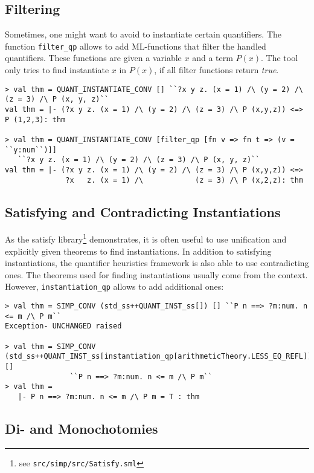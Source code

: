 \documentclass[a4paper,12pt,DIV=12,oneside]{scrbook}
\theoremstyle{definition}
\theoremstyle{remark}
\begin{document}
  
\subsection{Filtering}
Sometimes, one might want to avoid to instantiate certain quantifiers. 
The function \texttt{filter\_qp} allows to add ML-functions that filter the handled
quantifiers. These functions are given a variable $x$ and a term $P(x)$. 
The tool only tries to find instantiate $x$ in $P(x)$, if all filter functions
return \textit{true}.  

{\scriptsize
\begin{verbatim}
> val thm = QUANT_INSTANTIATE_CONV [] ``?x y z. (x = 1) /\ (y = 2) /\ (z = 3) /\ P (x, y, z)``
val thm = |- (?x y z. (x = 1) /\ (y = 2) /\ (z = 3) /\ P (x,y,z)) <=> P (1,2,3): thm

> val thm = QUANT_INSTANTIATE_CONV [filter_qp [fn v => fn t => (v = ``y:num``)]] 
   ``?x y z. (x = 1) /\ (y = 2) /\ (z = 3) /\ P (x, y, z)``
val thm = |- (?x y z. (x = 1) /\ (y = 2) /\ (z = 3) /\ P (x,y,z)) <=>
              ?x   z. (x = 1) /\            (z = 3) /\ P (x,2,z): thm
\end{verbatim}}

\subsection{Satisfying and Contradicting Instantiations}

As the satisfy library\footnote{see \texttt{src/simp/src/Satisfy.sml}} demonstrates, it is often 
useful to use unification and explicitly given theorems to 
find instantiations. In addition to satisfying instantiations, the quantifier heuristics framework
is also able to use contradicting ones. The theorems used for finding instantiations usually come from
the context. However, \texttt{instantiation\_qp} allows to add additional ones:

{\scriptsize
\begin{verbatim}
> val thm = SIMP_CONV (std_ss++QUANT_INST_ss[]) [] ``P n ==> ?m:num. n <= m /\ P m``
Exception- UNCHANGED raised

> val thm = SIMP_CONV (std_ss++QUANT_INST_ss[instantiation_qp[arithmeticTheory.LESS_EQ_REFL]]) [] 
               ``P n ==> ?m:num. n <= m /\ P m``
> val thm =
   |- P n ==> ?m:num. n <= m /\ P m = T : thm
\end{verbatim}}

\subsection{Di- and Monochotomies}
\end{document}
